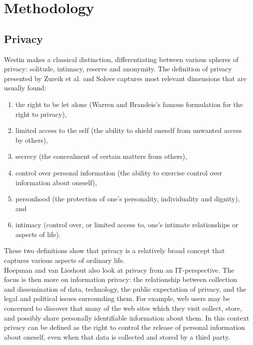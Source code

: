 \section{Methodology}
\label{sec:methodology}
	
\subsection{Privacy}	
Westin \cite{westin1968privacy} makes a classical distinction, differentiating between various spheres of privacy: solitude, intimacy, reserve and anonymity. The definition of privacy presented by Zureik et al. \cite{privacydimensions} and Solove \cite{solove2002conceptualizing} captures most relevant dimensions that are usually found:
\begin{enumerate}
	\item the right to be let alone (Warren and Brandeis's famous formulation for the right to privacy),
	\item limited access to the self (the ability to shield oneself from unwanted access by others), 
	\item secrecy (the concealment of certain matters from others),
	\item control over personal information (the ability to exercise control over information about oneself), 
	\item personhood (the protection of one's personality, individuality and dignity), and 
	\item intimacy (control over, or limited access to, one's intimate relationships or aspects of life).
\end{enumerate} 
These two definitions show that privacy is a relatively broad concept that captures various aspects of ordinary life.\\

Hoepman and van Lieshout \cite{privacy} also look at privacy from an IT-perspective. The focus is then more on information privacy: the relationship between collection and dissemination of data, technology, the public expectation of privacy, and the legal and political issues surrounding them. For example, web users may be concerned to discover that many of the web sites which they visit collect, store, and possibly share personally identifiable information about them. In this context privacy can be defined as the right to control the release of personal information about oneself, even when that data is collected and stored by a third party.\\

